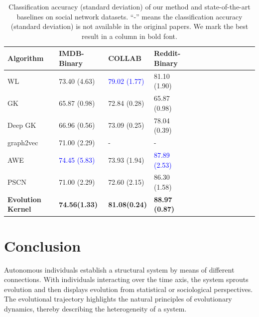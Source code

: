 \documentclass[10pt,journal,compsoc]{IEEEtran}
\begin{document}
\begin{table}
\centering
\caption{Classiﬁcation accuracy (standard deviation) of our method and state-of-the-art baselines on social network datasets. “-” means the classiﬁcation accuracy (standard deviation) is not available in the original papers. We mark the best result in a column in bold font.}
{
\begin{tabular}{lllllllllllll}
\toprule
\textbf{Algorithm}                          & \textbf{IMDB-Binary}               & \textbf{COLLAB}                   & \textbf{Reddit-Binary}         \\
\midrule
WL~\cite{weisfeiler-lehman-graph-kernels}   & 73.40 (4.63)                  & \textcolor{blue}{79.02 (1.77)}    & 81.10 (1.90)              \\
GK~\cite{graphlet-kernel}                   & 65.87 (0.98)                  & 72.84 (0.28)                      & 65.87 (0.98)              \\
Deep GK~\cite{deep-graph-kernel}            & 66.96 (0.56)                  & 73.09 (0.25)                      & 78.04 (0.39)              \\
graph2vec~\cite{node2vec}                   & 71.00 (2.29)                  & -                                 & -                         \\
AWE~\cite{AWE}                              & \textcolor{blue}{74.45 (5.83)}& 73.93 (1.94)                      & \textcolor{blue}{87.89 (2.53)}  \\
PSCN~\cite{PSCN}                            & 71.00 (2.29)                  & 72.60 (2.15)                      & 86.30 (1.58)              \\
\midrule
\textbf{Evolution Kernel}                   & \textbf{74.56(1.33)}          & \textbf{81.08(0.24)}              & \textbf{88.97 (0.87)}     \\
\bottomrule
\end{tabular}}
\label{Table-results-social}
\end{table}


\section{Conclusion}
Autonomous individuals establish a structural system by means of different connections. With individuals interacting over the time axis, the system sprouts evolution and then displays evolution from statistical or sociological perspectives. The evolutional trajectory highlights the natural principles of evolutionary dynamics, thereby describing the heterogeneity of a system.
\end{document}

